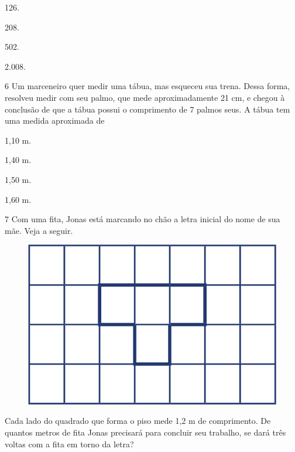\begin{multicols}{2}
\begin{escolha}
\item
  126.
\item
  208.
\item
  502.
\item
  2.008.
\end{escolha}
\end{multicols}

\num{6} Um marceneiro quer medir uma tábua, mas esqueceu sua trena. Dessa
forma, resolveu medir com seu palmo, que mede aproximadamente 21 cm, e
chegou à conclusão de que a tábua possui o comprimento
de 7 palmos seus. A tábua tem uma medida aproximada de

\begin{multicols}{2}
\begin{escolha}
\item
  1,10 m.
\item
  1,40 m.
\item
  1,50 m.
\item
  1,60 m.
\end{escolha}
\end{multicols}

\num{7} Com uma fita, Jonas está marcando no chão a letra inicial do nome de sua mãe. Veja a seguir.

\begin{figure}[htpb!]
\centering
\includegraphics[width=\textwidth]{media/image81.png}
\end{figure}

Cada lado do quadrado que forma o piso mede 1,2 m de
comprimento. De quantos metros de fita Jonas precisará para concluir seu
trabalho, se dará três voltas com a fita em torno da letra?

